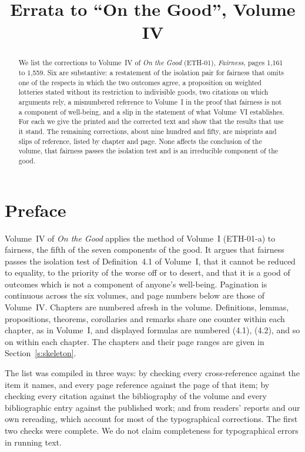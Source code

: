 \documentclass{situationist-preprint}
\title{Errata to \enquote{On the Good}, Volume IV}
\begin{document}
\maketitle

\begin{abstract}
We list the corrections to Volume~IV of \emph{On the Good} (ETH-01), \emph{Fairness}, pages 1,161 to 1,559. Six are substantive: a restatement of the isolation pair for fairness that omits one of the respects in which the two outcomes agree, a proposition on weighted lotteries stated without its restriction to indivisible goods, two citations on which arguments rely, a misnumbered reference to Volume~I in the proof that fairness is not a component of well-being, and a slip in the statement of what Volume~VI establishes. For each we give the printed and the corrected text and show that the results that use it stand. The remaining corrections, about nine hundred and fifty, are misprints and slips of reference, listed by chapter and page. None affects the conclusion of the volume, that fairness passes the isolation test and is an irreducible component of the good.
\end{abstract}

\section{Preface}

Volume~IV of \emph{On the Good} applies the method of Volume~I (ETH-01-a) to fairness, the fifth of the seven components of the good. It argues that fairness passes the isolation test of Definition~4.1 of Volume~I, that it cannot be reduced to equality, to the priority of the worse off or to desert, and that it is a good of outcomes which is not a component of anyone's well-being. Pagination is continuous across the six volumes, and page numbers below are those of Volume~IV. Chapters are numbered afresh in the volume. Definitions, lemmas, propositions, theorems, corollaries and remarks share one counter within each chapter, as in Volume~I, and displayed formulas are numbered (4.1), (4.2), and so on within each chapter. The chapters and their page ranges are given in Section~\ref{s:skeleton}.

The list was compiled in three ways: by checking every cross-reference against the item it names, and every page reference against the page of that item; by checking every citation against the bibliography of the volume and every bibliographic entry against the published work; and from readers' reports and our own rereading, which account for most of the typographical corrections. The first two checks were complete. We do not claim completeness for typographical errors in running text.
\end{document}

